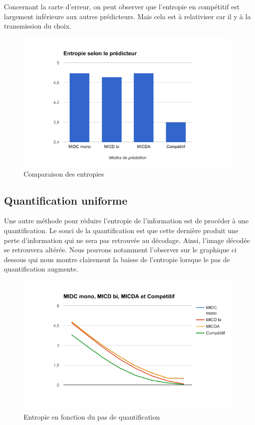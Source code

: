 \documentclass[12pt]{report}
\begin{document}
Concernant la carte d'erreur, on peut observer que l'entropie en compétitif est largement inférieure aux autres prédicteurs. Mais cela est à relativiser car il y à la transmission du choix.

\begin{figure}[H]
\begin{center}
\includegraphics[scale=0.8]{../ImageRes/entropie.png} 
\caption{Comparaison des entropies}
\end{center}
\end{figure}

\subsection{Quantification uniforme}

Une autre méthode pour réduire l'entropie de l'information est de procéder à une quantification. Le souci de la quantification est que cette dernière produit une perte d'information qui ne sera pas retrouvée au décodage. Ainsi, l'image décodée se retrouvera altérée. Nous pouvons notamment l'observer sur le graphique ci dessous qui nous montre clairement la baisse de l'entropie lorsque le pas de quantification augmente.

\begin{figure}[H]
\begin{center}
\includegraphics[scale=0.8]{../ImageRes/entropieQ.png} 
\caption{Entropie en fonction du pas de quantification}
\end{center}
\end{figure}
\end{document}

